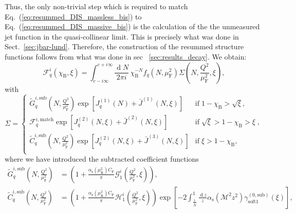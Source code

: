 \documentclass[letterpaper,11pt]{article}
\newcommand{\as}{\alpha_\text{s}}
\newcommand{\cf}{C_{\text{F}}}
\DeclareMathOperator{\De}{d}
\newcommand{\de}{\De\!}
\newcommand{\chib}{\chi_{\text{B}}}
\newcommand{\gszerotildeMm}{\gamma_\text{soft1}^{(0,\text{sub})}}
\newcommand{\muf}{\mu_{\text{F}}}
\newcommand{\mur}{\mu_{\text{R}}}
\begin{document}
Thus, the only non-trivial step which is required to match Eq.~(\ref{eq:resummed_DIS_massless_bis}) to Eq.~(\ref{eq:resummed_DIS_massive_bis}) is the calculation of the the unmeasured jet function in the quasi-collinear limit. This is precisely what was done in Sect.~\ref{sec:jbar-lund}. Therefore, the construction of the resummed structure functions follows from what was done in sec~ \ref{sec:results_decay}. 
We obtain: 
%
\begin{equation}\label{eq:final-result-dis-start}
\mathcal{F}^i_q(\chi_{\text{B}},\xi)= \int_{c-i \infty}^{c+ i \infty}\frac{\de N}{2 \pi i}\, \chi_{\text{B}}^{-N} f_q(N,\muf^2)\Sigma\left(N, \frac{Q^2}{\muf^2},\xi\right),
\end{equation}
with
\begin{equation}\label{eq:final-result-dis}
\Sigma=
\begin{cases} 	
\widetilde{G}^{i,\text{sub}}_q\left(N,\frac{Q^2}{\muf^2}\right)\exp{[J^{(1)}_q(N)+\bar{J}^{(1)}(N,\xi)]}  &  \text{if}\;1-\chib>\sqrt{\xi} ,\\ 
\mathcal{F}_q^{i,\text{match}}\exp{[J^{(2)}_q(N,\xi)+\bar{J}^{(2)}(N,\xi)]} & \text{if}\;\sqrt{\xi}>1-\chib>\xi\; , \\ 
\widetilde{C}^{i,\text{sub}}_q\left(N,\frac{Q^2}{\muf^2}\right)\exp{[J^{(2)}_q(N,\xi)+\bar{J}^{(3)}(N,\xi)]} &\text{if} \;\xi>1-\chib ,\\
\end{cases}	
\end{equation}
where we have introduced the subtracted coefficient functions
\begin{align}\label{eq:dis-subtracted}
\widetilde{G}^{i,\text{sub}}_q\left(N,\frac{Q^2}{\muf^2}\right) &=\left(1+ \frac{\as(\mur^2)\cf }{\pi}\mathcal{G}^i_1\left(\frac{Q^2}{\muf^2},\xi\right)\right),
\nonumber\\
\widetilde{C}^{i,\text{sub}}_q\left(N,\frac{Q^2}{\muf^2}\right) &=
 \left(1+ \frac{\as(\mur^2)\cf }{\pi}\mathcal{H}^i_1\left(\frac{Q^2}{\muf^2},\xi\right)\right)
\exp\left[ -2\int^{1}_{\frac{1}{\bar N}} \frac{\de z}{z}  \as\left(\mathcal{M}^2z^2\right) \gszerotildeMm(\xi) \right],
\end{align}
\end{document}
